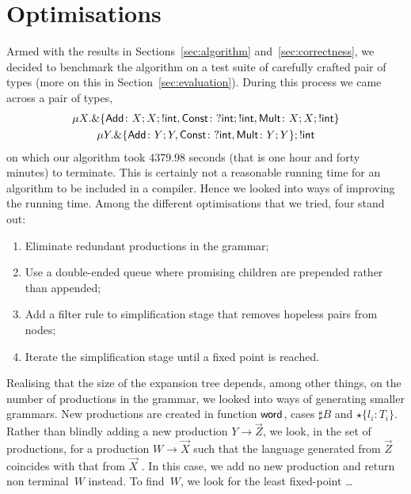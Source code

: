\section{Optimisations}
\label{sec:optimisations}

Armed with the results in Sections~\ref{sec:algorithm}
and~\ref{sec:correctness}, we decided to benchmark the algorithm on a
test suite of carefully crafted pair of types (more on this in
Section~\ref{sec:evaluation}). During this process we came across a
pair of types,
%
\begin{gather*}
    \mu X . \&\{ \mathsf{Add}\colon X;X; !\mathsf{int},
    \mathsf{Const}\colon ?\mathsf{int};!\mathsf{int},
    \mathsf{Mult}\colon X;X;!\mathsf{int} \}
    \\
    \mu Y . \&\{ \mathsf{Add}\colon Y;Y,
    \mathsf{Const}\colon ?\mathsf{int},
    \mathsf{Mult}\colon Y;Y \}; !\mathsf{int}
\end{gather*}
%
on which our algorithm took 4379.98 seconds (that is one hour and
forty minutes) to terminate. This is certainly not a reasonable
running time for an algorithm to be included in a compiler. Hence we
looked into ways of improving the running time. Among the different
optimisations that we tried, four stand out:
%
\begin{enumerate}
\item Eliminate redundant productions in the grammar;
\item Use a double-ended queue where promising children are prepended
  rather than appended;
\item Add a filter rule to simplification stage that removes hopeless
  pairs from nodes;
\item Iterate the simplification stage until a fixed point is reached.
\end{enumerate}


Realising that the size of the expansion tree depends, among other
things, on the number of productions in the grammar, we looked into
ways of generating smaller grammars. New productions are created in
function $\mathsf{word}$, cases $\sharp B$ and $\star\{l_i\colon
T_i\}$. Rather than blindly adding a new production
$Y \rightarrow \vec Z$, we look, in the set of productions, for a
production $W \rightarrow \vec X$ such that the language generated
from $\vec Z$ coincides with that from $\vec X$ . In this
case, we add no new production and return non terminal~$W$ instead. To
find~$W$, we look for the least fixed-point \dots

